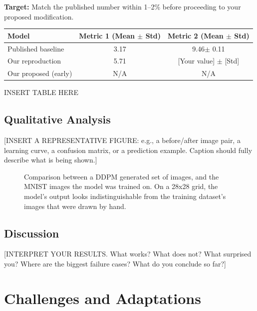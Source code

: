 \documentclass[11pt, letterpaper]{article}
\begin{document}
\begin{notebox}
\textbf{Target:} Match the published number within 1--2\% before proceeding
to your proposed modification.
\end{notebox}

\begin{center}
\begin{tabular}{lcc}
\toprule
\textbf{Model} & \textbf{Metric 1 (Mean $\pm$ Std)} & \textbf{Metric 2 (Mean $\pm$ Std)} \\
\midrule
Published baseline & 3.17 &  9.46$\pm$ 0.11 \\
Our reproduction & 5.71 & [Your value] $\pm$ [Std] \\
Our proposed (early) & N/A & N/A \\
\bottomrule
\end{tabular}

INSERT TABLE HERE

\end{center}

\subsection{Qualitative Analysis}

[INSERT A REPRESENTATIVE FIGURE: e.g., a before/after image pair, a learning
curve, a confusion matrix, or a prediction example. Caption should fully
describe what is being shown.]

\begin{figure}[h]
  \centering
  \caption{Comparison between a DDPM generated set of images, and the MNIST images the model was trained on. On a 28x28 grid, the model's output looks indistinguishable from the training dataset's images that were drawn by hand.}
  \label{fig:qual}
\end{figure}

\subsection{Discussion}

[INTERPRET YOUR RESULTS. What works? What does not? What surprised you?
Where are the biggest failure cases? What do you conclude so far?]

\section{Challenges and Adaptations}
\end{document}
